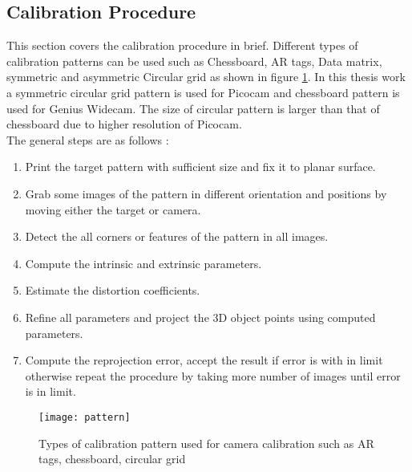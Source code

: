 \subsection{Calibration Procedure}
This section covers the calibration procedure in brief. Different types of calibration patterns can be used such as Chessboard, AR tags, Data matrix, symmetric and asymmetric Circular grid as shown in figure \ref{fig:pattern}. In this thesis work a symmetric circular grid pattern is used for Picocam and chessboard pattern is used for Genius Widecam. The size of circular pattern is larger than that of chessboard due to higher resolution of Picocam.\\
\newline
The general steps are as follows \cite{cameracalib}:
\begin{enumerate}
	\item Print the target pattern with sufficient size and fix it to planar surface.
	\item Grab some images of the pattern in different orientation and positions by moving either the target or camera.
	\item Detect the all corners or features of the pattern in all images.
	\item Compute the intrinsic and extrinsic parameters.
	\item Estimate the distortion coefficients.
	\item Refine all parameters and project the 3D object points using computed parameters.
	\item Compute the reprojection error, accept the result if error is with in limit otherwise repeat the procedure by taking more number of images until error is in limit.
\end{enumerate}
\begin{figure}[h!]
	\centering
	\texttt{[image: pattern]}
	\caption{Types of calibration pattern used for camera calibration such as AR tags, chessboard, circular grid \cite{calibio}}
	\label{fig:pattern}
\end{figure}

